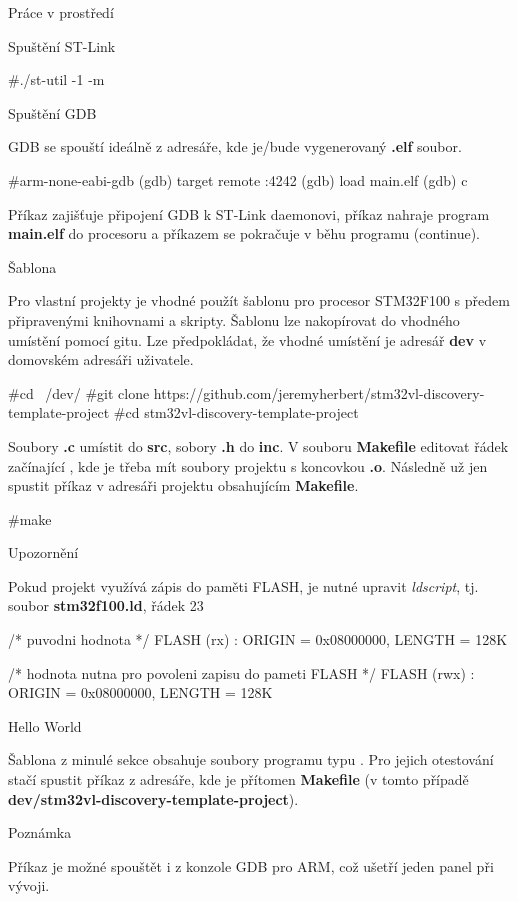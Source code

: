 \chap Práce v prostředí


\sec Spuštění ST-Link

\begtt
#./st-util -1 -m
\endtt


\sec Spuštění GDB

GDB se spouští ideálně z adresáře, kde je/bude vygenerovaný {\bf .elf} soubor. 

\begtt
#arm-none-eabi-gdb
(gdb) target remote :4242
(gdb) load main.elf
(gdb) c
\endtt

Příkaz  zajišťuje připojení GDB k ST-Link daemonovi, příkaz  nahraje program {\bf main.elf} do procesoru a příkazem  se pokračuje v běhu programu (continue).


\sec Šablona

Pro vlastní projekty je vhodné použít šablonu pro procesor STM32F100 s předem připravenými knihovnami a skripty. Šablonu lze nakopírovat do vhodného umístění pomocí gitu. Lze předpokládat, že vhodné umístění je adresář {\bf dev} v domovském adresáři uživatele.

\begtt
#cd ~/dev/
#git clone https://github.com/jeremyherbert/stm32vl-discovery-template-project
#cd stm32vl-discovery-template-project
\endtt

Soubory {\bf .c} umístit do {\bf src}, sobory {\bf .h} do {\bf inc}. V souboru {\bf Makefile} editovat řádek začínající , kde je třeba mít soubory projektu s koncovkou {\bf .o}. Následně už jen spustit příkaz  v adresáři projektu obsahujícím {\bf Makefile}.

\begtt
#make
\endtt


\sec Upozornění

Pokud projekt využívá zápis do paměti FLASH, je nutné upravit {\em ldscript}, tj. soubor {\bf stm32f100.ld}, řádek 23

\begtt
/* puvodni hodnota */
FLASH (rx) : ORIGIN = 0x08000000, LENGTH = 128K

/* hodnota nutna pro povoleni zapisu do pameti FLASH */
FLASH (rwx) : ORIGIN = 0x08000000, LENGTH = 128K
\endtt


\sec Hello World

Šablona z minulé sekce obsahuje soubory programu typu . Pro jejich otestování stačí spustit příkaz  z adresáře, kde je přítomen {\bf Makefile} (v tomto případě {\bf dev/stm32vl-discovery-template-project}).


\sec Poznámka

Příkaz  je možné spouštět i z konzole GDB pro ARM, což ušetří jeden panel při vývoji.




